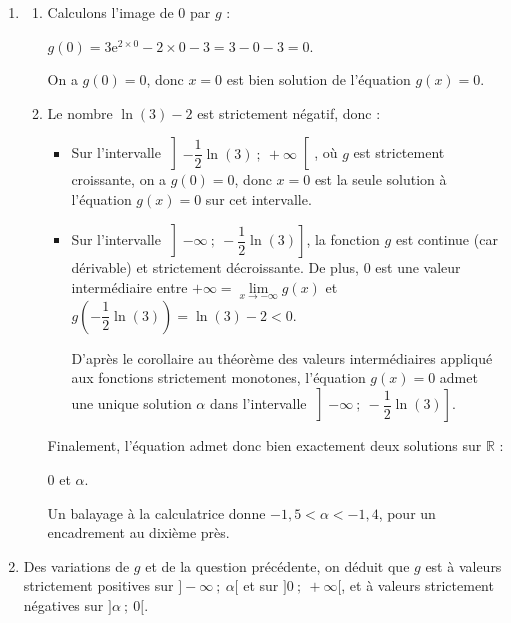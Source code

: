 \documentclass[10pt]{article}
\providecommand{\R}{\mathbb{R}}
\providecommand{\e}{{\mathrm{e}}}
\begin{document}
\begin{enumerate}
\begin{enumerate}
\begin{center}
		 \end{center}
		 

		 
		 
		 
		 
		 
		 
		 

La fonction $g$ admet bien un minimum égal à $\ln (3)-2$, atteint pour $x = -\dfrac{1}{2}\ln(3)$.
	\end{enumerate}
\item 
	\begin{enumerate}
		\item Calculons l'image de 0 par $g$ :

$g(0) = 3\e^{2\times 0} - 2\times 0 - 3 = 3 - 0 - 3 = 0$.

On a $g(0) = 0$, donc $x = 0$ est bien solution de l'équation $g(x)=0$.
		\item Le nombre $\ln (3)-2$ est strictement négatif, donc :

\begin{itemize}
\item Sur l'intervalle $\left]-\dfrac{1}{2}\ln(3)~;~+\infty\right[$, où $g$ est strictement croissante, on a $g(0) = 0$, donc $x=0$ est la seule solution à l'équation $g(x) = 0$ sur cet intervalle.
\item Sur l'intervalle $\left]-\infty~;~ -\dfrac{1}{2}\ln(3) \right]$, la fonction $g$ est continue (car dérivable) et strictement décroissante. De plus, 0 est une valeur intermédiaire entre $+\infty = \lim\limits_{x \to -\infty} g(x)$ et $g\left(-\dfrac{1}{2}\ln(3)\right) = \ln(3) - 2 < 0$.

D'après le corollaire au théorème des valeurs intermédiaires appliqué aux fonctions strictement monotones, l'équation $g(x) = 0$ admet une unique solution $\alpha$ dans l'intervalle $\left]-\infty~;~ -\dfrac{1}{2}\ln(3) \right]$.
\end{itemize}

Finalement, l'équation admet donc bien exactement deux solutions sur $\R$ : 

0 et $\alpha$.

Un balayage à la calculatrice donne $-1,5 <\alpha < -1,4$, pour un encadrement au dixième près.
	\end{enumerate}
\item Des variations de $g$ et de la question précédente, on déduit que $g$ est à valeurs strictement positives sur $]-\infty~;~\alpha[$ et sur $]0~;~+\infty[$, et à valeurs strictement négatives sur $]\alpha~;~0[$.
	\end{enumerate}
\end{document}
